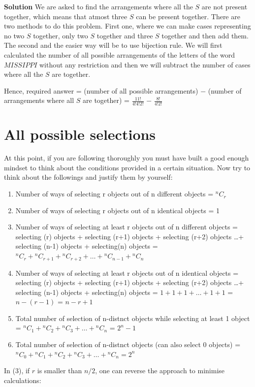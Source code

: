\documentclass[12pt, a4paper]{article}
\begin{document}
\textbf{Solution} We are asked to find the arrangements where all the $S$ are not present together, which means that atmost three $S$ can be present together. There are two methods to do this problem. First one, where we can make cases representing no two $S$ together, only two $S$ together and three $S$ together and then add them. The second and the easier way will be to use bijection rule. We will first calculated the number of all possible arrangements of the letters of the word $MISSIPPI$ without any restriction and then we will subtract the number of cases where all the $S$ are together.
\begin{center}
 Hence, required answer = (number of all possible arrangements) $-$ (number of arrangements where all $S$ are together) \newline = $\frac{11!}{4!4!2!}$ $-$ $\frac{8!}{4!2!}$
\end{center}

\section{All possible selections}
At this point, if you are following thoroughly you must have built a good enough mindset to think about the conditions provided in a certain situation. Now try to think about the followings and justify them by yourself:
\begin{enumerate}
    \item Number of ways of selecting r objects out of n different objects = $^nC_r$
    \item Number of ways of selecting r objects out of n identical objects = 1
    \item Number of ways of selecting at least r objects out of n different objects = selecting (r) objects + selecting (r+1) objects + selecting (r+2) objects \dots + selecting (n-1) objects + selecting(n) objects =${^nC_r} + {^nC_{r+1}} + {^nC_{r+2}}+ \dots + {^nC_{n-1}} + {^nC_n}$
    \item Number of ways of selecting at least r objects out of n identical objects = selecting (r) objects + selecting (r+1) objects + selecting (r+2) objects \dots + selecting (n-1) objects + selecting(n) objects = $1+1+1+ \dots +1+1$ = $n-(r-1)$ = $n-r+1$
    \item Total number of selection of n-distnct objects while selecting at least 1 object = ${^nC_1}+{^nC_2}+{^nC_3}+ \dots + {^nC_n}$ = $2^n -1$ 
    \item Total number of selection of n-distnct objects (can also select 0 objects) = ${^nC_0}+{^nC_1}+{^nC_2}+{^nC_3}+ \dots + {^nC_n} = 2^n$
\end{enumerate}
In (3), if $r$ is smaller than $n/2$, one can reverse the approach to minimise calculations: \\
\end{document}
